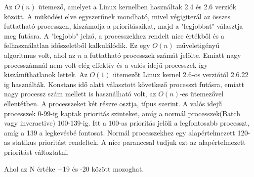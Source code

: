 


Az $O(n)$ ütemező, amelyet a Linux kernelben használtak 2.4 és 2.6 verziók között. A müködési elve egyszerűnek mondható, mivel végigiterál az összes futtatható processzen, kiszámolja a prioritásaikat, majd a "legjobbat" választja meg futásra. A "legjobb" jelző, a processzekhez rendelt nice értékből és a felhasználatlan időszeletből kalkulálódik.
Ez egy $O(n)$ műveletigényű algoritmus volt, ahol az $n$ a futtatható processzek számát jelölte. Emiatt nagy processzámnál nem volt elég effektív és a valós idejű processzek így kiszámíthatlanok lettek.
Az $O(1)$ ütemezőt Linux kernel 2.6-os verziótól 2.6.22 ig használták. Konstans idő alatt választott következő processzt futásra, emiatt nagy processz szám mellett is használható volt, az $O(n)$-es ütemezővel ellentétben.
A processzeket két részre osztja, típus szerint. A valós idejű processzek 0-99-ig kaptak prioritás szinteket, amíg a normál processzek(Batch vagy inveractive) 100-139-ig. Itt a 100-as prioritás jelöli a legfontosabb processzt, amíg a 139 a legkevésbé fontosat. Normál processzekhez egy alapértelmezett 120-as statikus prioritást rendeltek. A nice paranccsal tudjuk ezt az alapértelmezett prioritást változtatni.
Ahol az N értéke +19 és -20 között mozoghat.

